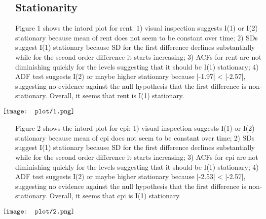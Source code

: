 \documentclass[12pt, times]{article}
\begin{document}
\subsection{Stationarity}
Figure 1 shows the intord plot for rent: 1)	visual inspection suggests I(1) or I(2) stationary because mean of rent does not seem to be constant over time; 2) SDs suggest I(1) stationary because SD for the first difference declines substantially while for the second order difference it starts increasing; 3) ACFs for rent are not diminishing quickly for the levels suggesting that it should be I(1) stationary; 4)	ADF test suggests I(2) or maybe higher stationary because |-1.97| < |-2.57|, suggesting no evidence against the null hypothesis that the first difference is non-stationary. Overall, it seems that rent is I(1) stationary.
\begin{figure}[H]
  \begin{center}
    $
      \begin{array}
        [c]{cc}%
        \makebox[0pt]{\texttt{[image: plot/1.png]}}
      \end{array}
    $
  \end{center}
  \vspace{-1.5em}
  \caption{}
\end{figure}
\vspace{-1.5em}
\hspace{1.5em}Figure 2 shows the intord plot for cpi: 1) visual inspection suggests I(1) or I(2) stationary because mean of cpi does not seem to be constant over time; 2) SDs suggest I(1) stationary because SD for the first difference declines substantially while for the second order difference it starts increasing; 3) ACFs for cpi are not diminishing quickly for the levels suggesting that it should be I(1) stationary; 4) ADF test suggests I(2) or maybe higher stationary because |-2.53| < |-2.57|, suggesting no evidence against the null hypothesis that the first difference is non-stationary. Overall, it seems that cpi is I(1) stationary.
\begin{figure}[H]
  \begin{center}
    $
      \begin{array}
        [c]{cc}%
        \makebox[0pt]{\texttt{[image: plot/2.png]}}
      \end{array}
    $
  \end{center}
  \vspace{-1.5em}
  \caption{}
\end{figure}
\end{document}
